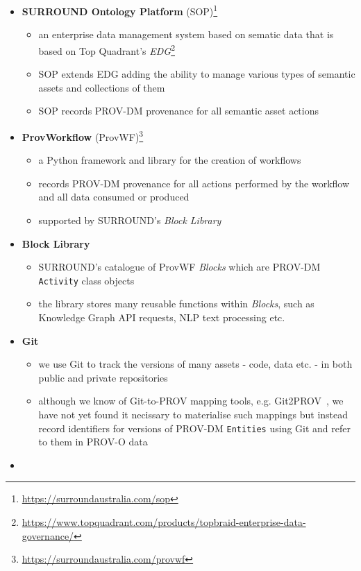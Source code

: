 \documentclass[letterpaper,twocolumn,10pt]{article}
\begin{document}
\begin{itemize}
  \item \textbf{SURROUND Ontology Platform} (SOP)\footnote{\url{https://surroundaustralia.com/sop}}
  \begin{itemize}
    \item an enterprise data management system based on sematic data that is based on Top Quadrant's \textit{EDG}\footnote{\url{https://www.topquadrant.com/products/topbraid-enterprise-data-governance/}}
    \item SOP extends EDG adding the ability to manage various types of semantic assets and collections of them
    \item SOP records PROV-DM provenance for all semantic asset actions
  \end{itemize}
  \item \textbf{ProvWorkflow} (ProvWF)\footnote{\url{https://surroundaustralia.com/provwf}}
  \begin{itemize}
    \item a Python framework and library for the creation of workflows
    \item records PROV-DM provenance for all actions performed by the workflow and all data consumed or produced
    \item supported by SURROUND's \textit{Block Library}
  \end{itemize}
  \item \textbf{Block Library}
  \begin{itemize}
    \item SURROUND's catalogue of ProvWF \textit{Blocks} which are PROV-DM \texttt{Activity} class objects
    \item the library stores many reusable functions within \textit{Blocks}, such as Knowledge Graph API requests, NLP text processing etc.
  \end{itemize}
  \item \textbf{Git}
  \begin{itemize}
    \item we use Git to track the versions of many assets - code, data etc. - in both public and private repositories
    \item although we know of Git-to-PROV mapping tools, e.g. Git2PROV~\cite{tom_de_nies_git2prov_nodate}, we have not yet found it necissary to materialise such mappings but instead record identifiers for versions of PROV-DM \texttt{Entities} using Git and refer to them in PROV-O data
  \end{itemize}\item 
\end{itemize}
\end{document}
